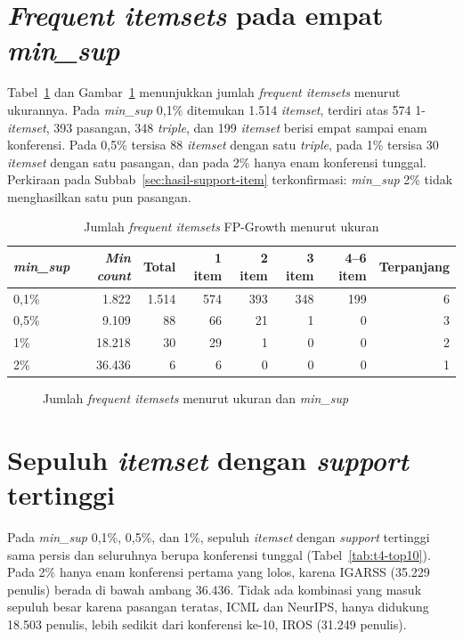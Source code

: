 \section{\textit{Frequent itemsets} pada empat \textit{min\_sup}}
\label{sec:hasil-t4-fp-jumlah}
Tabel~\ref{tab:t4-ukuran} dan Gambar~\ref{fig:t4-ukuran} menunjukkan jumlah \textit{frequent itemsets} menurut ukurannya. Pada \textit{min\_sup} 0,1\% ditemukan 1.514 \textit{itemset}, terdiri atas 574 1-\textit{itemset}, 393 pasangan, 348 \textit{triple}, dan 199 \textit{itemset} berisi empat sampai enam konferensi. Pada 0,5\% tersisa 88 \textit{itemset} dengan satu \textit{triple}, pada 1\% tersisa 30 \textit{itemset} dengan satu pasangan, dan pada 2\% hanya enam konferensi tunggal. Perkiraan pada Subbab~\ref{sec:hasil-support-item} terkonfirmasi: \textit{min\_sup} 2\% tidak menghasilkan satu pun pasangan.

\begin{table}[ht]
\caption{Jumlah \textit{frequent itemsets} FP-Growth menurut ukuran}
\label{tab:t4-ukuran}
\small
\begin{tabular}{@{}lrrrrrrr@{}}
\toprule
\textbf{\textit{min\_sup}} & \textbf{\textit{Min count}} & \textbf{Total} & \textbf{1 item} & \textbf{2 item} & \textbf{3 item} & \textbf{4--6 item} & \textbf{Terpanjang} \\
\midrule
0,1\% & 1.822 & 1.514 & 574 & 393 & 348 & 199 & 6 \\
0,5\% & 9.109 & 88 & 66 & 21 & 1 & 0 & 3 \\
1\% & 18.218 & 30 & 29 & 1 & 0 & 0 & 2 \\
2\% & 36.436 & 6 & 6 & 0 & 0 & 0 & 1 \\
\bottomrule
\end{tabular}
\end{table}

\begin{figure}[ht]
\centering
{}
\caption{Jumlah \textit{frequent itemsets} menurut ukuran dan \textit{min\_sup}}
\label{fig:t4-ukuran}
\end{figure}

\section{Sepuluh \textit{itemset} dengan \textit{support} tertinggi}
\label{sec:hasil-t4-fp-top10}
Pada \textit{min\_sup} 0,1\%, 0,5\%, dan 1\%, sepuluh \textit{itemset} dengan \textit{support} tertinggi sama persis dan seluruhnya berupa konferensi tunggal (Tabel~\ref{tab:t4-top10}). Pada 2\% hanya enam konferensi pertama yang lolos, karena IGARSS (35.229 penulis) berada di bawah ambang 36.436. Tidak ada kombinasi yang masuk sepuluh besar karena pasangan teratas, ICML dan NeurIPS, hanya didukung 18.503 penulis, lebih sedikit dari konferensi ke-10, IROS (31.249 penulis).

